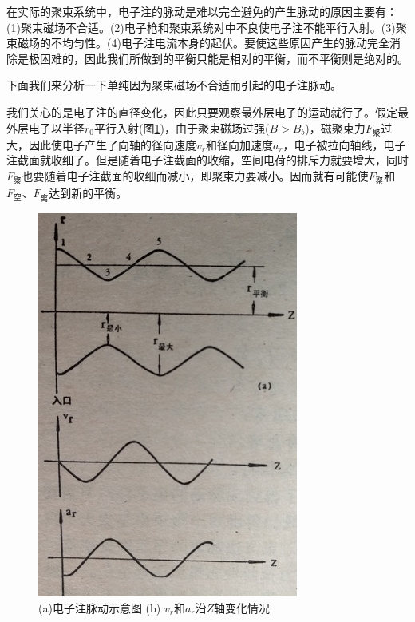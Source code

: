 在实际的聚束系统中，电子注的脉动是难以完全避免的产生脉动的原因主要有：(1)聚束磁场不合适。(2)电子枪和聚束系统对中不良使电子注不能平行入射。(3)聚束磁场的不均匀性。(4)电子注电流本身的起伏。要使这些原因产生的脉动完全消除是极困难的，因此我们所做到的平衡只能是相对的平衡，而不平衡则是绝对的。

下面我们来分析一下单纯因为聚束磁场不合适而引起的电子注脉动。

我们关心的是电子注的直径变化，因此只要观察最外层电子的运动就行了。假定最外层电子以半径$ r_0 $平行入射(图\ref{ch7-9})，由于聚束磁场过强($ B>B_b $)，磁聚束力$ F_{\textrm{聚}} $过大，因此使电子产生了向轴的径向速度$ v_r $和径向加速度$ a_r $，电子被拉向轴线，电子注截面就收细了。但是随着电子注截面的收缩，空间电荷的排斥力就要增大，同时$ F_\textrm{聚} $也要随着电子注截面的收细而减小，即聚束力要减小。因而就有可能使$ F_{\textrm{聚}} $和$ F_{\textrm{空}} $、$ F_{\textrm{离}} $达到新的平衡。

\begin{figure}[phtb]
	\centering
	\includegraphics[width=0.45\linewidth]{figure/ch7-9}
	\caption{(a)电子注脉动示意图 (b) $ v_r $和$ a_r $沿$ Z $轴变化情况}
	\label{ch7-9}
\end{figure}


